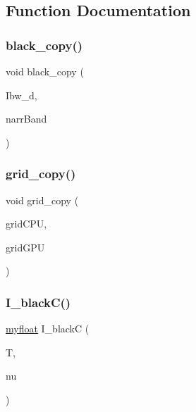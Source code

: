 \subsection{Function Documentation}
\mbox{\label{memory__copy_8cu_acdc271da1d0803d8e7c3d0ee14790a9c}} 
\subsubsection{\texorpdfstring{black\+\_\+copy()}{black\_copy()}}
{\footnotesize\ttfamily void black\+\_\+copy (\begin{DoxyParamCaption}\item[{\hyperlink{structEmissSpec}{Emiss\+Spec} $\ast$}]{Ibw\+\_\+d,  }\item[{\hyperlink{classNarrowBand}{Narrow\+Band} $\ast$}]{narr\+Band }\end{DoxyParamCaption})}

\mbox{\label{memory__copy_8cu_af1a4a3bb86afa191bf06b8ba47667510}} 
\subsubsection{\texorpdfstring{grid\+\_\+copy()}{grid\_copy()}}
{\footnotesize\ttfamily void grid\+\_\+copy (\begin{DoxyParamCaption}\item[{\hyperlink{classGridn}{Gridn} $\ast$}]{grid\+C\+PU,  }\item[{\hyperlink{classGridn}{Gridn} $\ast$}]{grid\+G\+PU }\end{DoxyParamCaption})}

\mbox{\label{memory__copy_8cu_a4377903e1c6e764da89fd87700eb74c3}} 
\subsubsection{\texorpdfstring{I\+\_\+black\+C()}{I\_blackC()}}
{\footnotesize\ttfamily \hyperlink{param_8h_a5f097c9f3873af7be7fc156e6a06ca5e}{myfloat} I\+\_\+blackC (\begin{DoxyParamCaption}\item[{\hyperlink{param_8h_a5f097c9f3873af7be7fc156e6a06ca5e}{myfloat}}]{T,  }\item[{\hyperlink{param_8h_a5f097c9f3873af7be7fc156e6a06ca5e}{myfloat}}]{nu }\end{DoxyParamCaption})}

